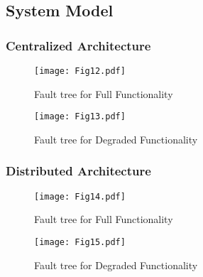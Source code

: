 \subsection{System Model}
\subsubsection{Centralized Architecture}

\begin{figure}[H]
  \centering
  \texttt{[image: Fig12.pdf]}
  \caption{Fault tree for Full Functionality}
  \label{fig12}
\end{figure}
\begin{figure}[H]
  \centering
  \texttt{[image: Fig13.pdf]}
  \caption{Fault tree for Degraded Functionality}
  \label{fig13}
\end{figure}
\subsubsection{Distributed Architecture}
\begin{figure}[H]
  \centering
  \texttt{[image: Fig14.pdf]}
  \caption{Fault tree for Full Functionality}
  \label{fig14}
\end{figure}
\begin{figure}[H]
  \centering
  \texttt{[image: Fig15.pdf]}
  \caption{Fault tree for Degraded Functionality}
  \label{fig15}
\end{figure}